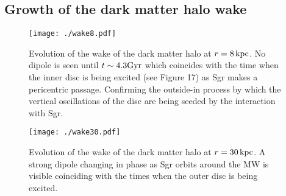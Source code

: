 \documentclass[useAMS,usenatbib]{mnras}
\begin{document}
\subsection{Growth of the dark matter halo wake}


\begin{figure}
\texttt{[image: ./wake8.pdf]}
\caption[]{Evolution of the wake of the dark matter halo at $r=8\,\rm{kpc}$. No dipole is seen until $t\sim 4.3 \rm{Gyr}$ which coincides with the time when the inner disc is being excited (see Figure 17) as Sgr makes a pericentric passage. Confirming the outside-in process by which the vertical oscillations of the disc are being seeded by the interaction with Sgr. }
\end{figure}

\begin{figure}
\texttt{[image: ./wake30.pdf]}
\caption[]{Evolution of the wake of the dark matter halo at $r=30 \,\rm{kpc}$. A strong dipole changing in phase as Sgr orbits around the MW is visible coinciding with the times when the outer disc is being excited.}
\end{figure}
\end{document}
